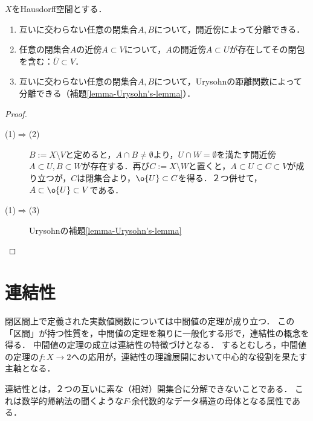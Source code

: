 \documentclass[uplatex,dvipdfmx]{jsreport}
\begin{document}
\begin{proposition}[正規性の特徴付け]\label{prop-characterizatioin-of-normality}
    $X$をHausdorff空間とする．
    \begin{enumerate}
        \item 互いに交わらない任意の閉集合$A,B$について，開近傍によって分離できる．
        \item 任意の閉集合$A$の近傍$A\subset V$について，$A$の開近傍$A\subset U$が存在してその閉包を含む：$\overline{U}\subset V$．
        \item 互いに交わらない任意の閉集合$A,B$について，Urysohnの距離関数によって分離できる（補題\ref{lemma-Urysohn's-lemma}）．
    \end{enumerate}
\end{proposition}
\begin{proof}\mbox{}
    \begin{description}
        \item[(1)$\Rightarrow$(2)] 
        $B:=X\setminus V$と定めると，$A\cap B\ne\emptyset$より，$U\cap W=\emptyset$を満たす開近傍$A\subset U,B\subset W$が存在する．再び$C:=X\setminus W$と置くと，$A\subset U\subset C\subset V$が成り立つが，$C$は閉集合より，$\o{U}\subset C$を得る．２つ併せて，$A\subset\o{U}\subset V$である．
        \item[(1)$\Rightarrow$(3)] Urysohnの補題\ref{lemma-Urysohn's-lemma}

    \end{description}
\end{proof}

\section{連結性}

\begin{tcolorbox}[colframe=ForestGreen, colback=ForestGreen!10!white, breakable ,colbacktitle=ForestGreen!40!white, coltitle=black,fonttitle=\bfseries\sffamily
    ,title=連結性]
    閉区間上で定義された実数値関数については中間値の定理が成り立つ．
    この「区間」が持つ性質を，中間値の定理を頼りに一般化する形で，連結性の概念を得る．
    中間値の定理の成立は連結性の特徴づけとなる．
    するとむしろ，中間値の定理の$f:X\to 2$への応用が，連結性の理論展開において中心的な役割を果たす主軸となる．

    連結性とは，２つの互いに素な（相対）開集合に分解できないことである．
    これは数学的帰納法の聞くような$F$-余代数的なデータ構造の母体となる属性である．
\end{tcolorbox}
\end{document}

